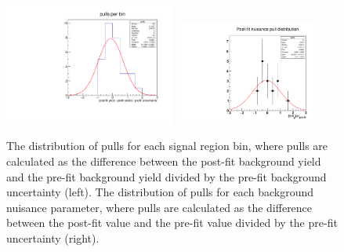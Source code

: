 \begin{figure}
\centering
\includegraphics[width=0.50\textwidth]{figures/results/pullsPerBin.pdf}
\includegraphics[width=0.43\textwidth]{figures/results/nuisancePulls.pdf}
\caption{The distribution of pulls for each signal region bin, where pulls are calculated as the difference between the post-fit background yield and the pre-fit background yield divided by the pre-fit background uncertainty (left). The distribution of pulls for each background nuisance parameter, where pulls are calculated as the difference between the post-fit value and the pre-fit value divided by the pre-fit uncertainty (right).}
\label{pre_postfit_pulls}
\end{figure}